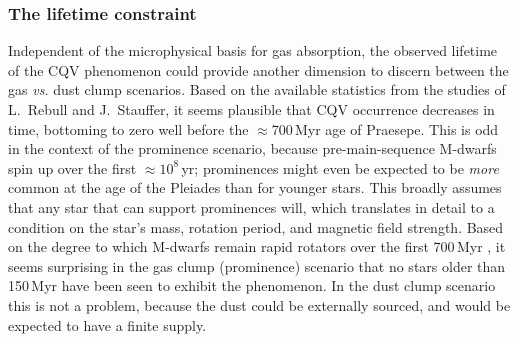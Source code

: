 \documentclass[11pt,twocolumn,tighten]{aastex63}
\begin{document}
\subsubsection{The lifetime constraint}
Independent of the microphysical basis for gas absorption, the observed
lifetime of the CQV phenomenon could provide another dimension to discern between
the gas {\it vs.} dust clump scenarios.
Based on the available statistics from the studies of L.~Rebull and J.~Stauffer,
it seems plausible that CQV occurrence decreases in time, bottoming to zero
well before the $\approx$700\,Myr age of Praesepe.
This is odd in the context of the prominence scenario, because pre-main-sequence
M-dwarfs spin up over the first $\approx$$10^8$\,yr;
prominences might even be expected to be {\it more} common at the 
age of the Pleiades than for younger stars.
This broadly assumes that any star that can support prominences will,
which translates in detail to a condition on the star's mass, rotation
period, and magnetic field strength.
Based on the degree to which M-dwarfs remain rapid rotators over the first 700\,Myr
\citep[e.g. Figure~13 of][]{2022AJ....164...80R}, 
it seems surprising in the gas clump (prominence) scenario that no stars
older than 150\,Myr have been seen to exhibit the phenomenon.
In the dust clump scenario this is not a problem, because the dust could
be externally sourced, and would be expected to have a finite supply.

%
%
\end{document}
